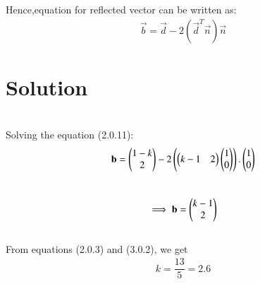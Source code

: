 \documentclass[journal,12pt,twocolumn]{IEEEtran}
\begin{document}
Hence,equation for reflected vector can be written as:
\begin{align}
    \vec{b}=\vec{d}-2(\vec{d}^{T}\vec{n})\vec{n}
\end{align}

\section{Solution}
\\
Solving the equation (2.0.11):\\
\begin{align}
    \textbf{b}=\begin{pmatrix}1-k\\2\end{pmatrix}-2\left(\begin{pmatrix}k-1  & 2\end{pmatrix}\begin{pmatrix}1\\0\end{pmatrix}\right).\begin{pmatrix}1\\0\end{pmatrix}
\end{align}
\\ 
\begin{align}
    \implies \textbf{b}=\begin{pmatrix}k-1 \\ 2\end{pmatrix}
\end{align}
\\
From equations (2.0.3) and (3.0.2), we get
\begin{align}
    k=\dfrac{13}{5}=2.6
\end{align}
\end{document}
